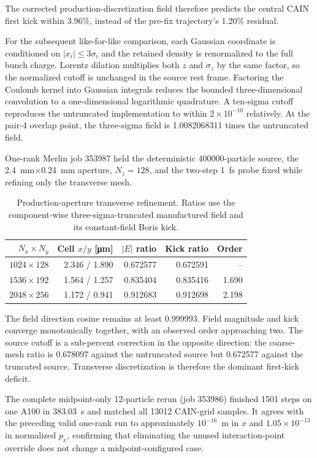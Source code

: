 \documentclass[11pt]{article}
\begin{document}
The corrected production-discretization field therefore predicts the central
CAIN first kick within 3.96\%, instead of the pre-fix trajectory's 1.20\%
residual.

For the subsequent like-for-like comparison, each Gaussian coordinate is
conditioned on $|x_i|\leq 3\sigma_i$ and the retained density is renormalized
to the full bunch charge.  Lorentz dilation multiplies both $z$ and
$\sigma_z$ by the same factor, so the normalized cutoff is unchanged in the
source rest frame. Factoring the Coulomb kernel into Gaussian integrals reduces
the bounded three-dimensional convolution to a one-dimensional logarithmic
quadrature. A ten-sigma cutoff reproduces the untruncated implementation to
within $2\times10^{-10}$ relatively. At the pair-4 overlap point, the
three-sigma field is 1.0082068311 times the untruncated field.

One-rank Merlin job 353987 held the deterministic 400000-particle source, the
\SI{2.4}{mm}$\times$\SI{0.24}{mm} aperture, $N_z=128$, and the two-step
\SI{1}{fs} probe fixed while refining only the transverse mesh.

\begin{table}[htbp]
  \centering
  \begin{tabular}{rrrrr}
    \hline
    $N_x\times N_y$ & Cell $x/y$ [\si{\micro m}] & $|E|$ ratio & Kick ratio & Order \\
    \hline
    $1024\times128$ & 2.346 / 1.890 & 0.672577 & 0.672591 & -- \\
    $1536\times192$ & 1.564 / 1.257 & 0.835404 & 0.835416 & 1.690 \\
    $2048\times256$ & 1.172 / 0.941 & 0.912683 & 0.912698 & 2.198 \\
    \hline
  \end{tabular}
  \caption{Production-aperture transverse refinement. Ratios use the
  component-wise three-sigma-truncated manufactured field and its
  constant-field Boris kick.}
  \label{tab:track12-production-refinement}
\end{table}

The field direction cosine remains at least 0.999993. Field magnitude and kick
converge monotonically together, with an observed order approaching two. The
source cutoff is a sub-percent correction in the opposite direction: the
coarse-mesh ratio is 0.678097 against the untruncated source but 0.672577
against the truncated source. Transverse discretization is therefore the
dominant first-kick deficit.

The complete midpoint-only 12-particle rerun (job 353986) finished 1501 steps
on one A100 in \SI{383.03}{s} and matched all 13012 CAIN-grid samples. It agrees
with the preceding valid one-rank run to approximately $10^{-16}$~m in $x$ and
$1.05\times10^{-13}$ in normalized $p_x$, confirming that eliminating the
unused interaction-point override does not change a midpoint-configured case.
\end{document}
